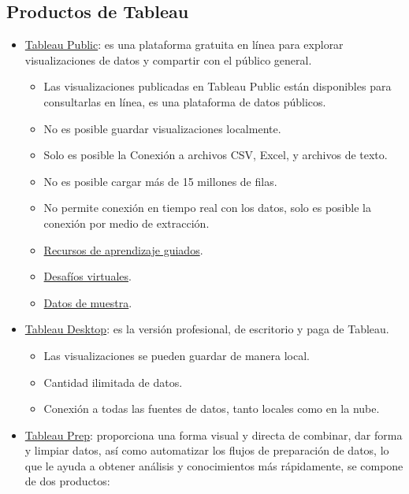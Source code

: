 \documentclass[
]{book}
\providecommand{\tightlist}{%
  \setlength{\itemsep}{0pt}\setlength{\parskip}{0pt}}
\begin{document}
\hypertarget{productos-de-tableau}{%
\subsection{Productos de Tableau}\label{productos-de-tableau}}

\begin{itemize}
\item
  \href{https://public.tableau.com/en-us/s/}{Tableau Public}: es una plataforma gratuita en línea para explorar visualizaciones de datos y compartir con el público general.

  \begin{itemize}
  \tightlist
  \item
    Las visualizaciones publicadas en Tableau Public están disponibles para consultarlas en línea, es una plataforma de datos públicos.
  \item
    No es posible guardar visualizaciones localmente.
  \item
    Solo es posible la Conexión a archivos CSV, Excel, y archivos de texto.
  \item
    No es posible cargar más de 15 millones de filas.
  \item
    No permite conexión en tiempo real con los datos, solo es posible la conexión por medio de extracción.
  \item
    \href{https://public.tableau.com/es-es/s/resources}{Recursos de aprendizaje guiados}.
  \item
    \href{https://public.tableau.com/es-es/s/resources}{Desafíos virtuales}.
  \item
    \href{https://public.tableau.com/es-es/s/resources}{Datos de muestra}.
  \end{itemize}
\item
  \href{https://www.tableau.com/products/desktop}{Tableau Desktop}: es la versión profesional, de escritorio y paga de Tableau.

  \begin{itemize}
  \tightlist
  \item
    Las visualizaciones se pueden guardar de manera local.
  \item
    Cantidad ilimitada de datos.
  \item
    Conexión a todas las fuentes de datos, tanto locales como en la nube.
  \end{itemize}
\item
  \href{https://www.tableau.com/trial/tableau-prep?utm_campaign_id=2017049\&utm_campaign=Prospecting-CORE-ALL-ALL-ALL-ALL\&utm_medium=Paid+Search\&utm_source=Google+Search\&utm_language=EN\&utm_country=RoLAC\&kw=\%2Btableau\%20\%2Bprep\&adgroup=CTX-Brand-Tableau+Prep-EN-B\&adused=335523927259\&matchtype=b\&placement=\&gclid=CjwKCAjw0On8BRAgEiwAincsHMNUqIicWtve96Be3NVOstpKxXYHS87VxJn-dxW5W3dLcqPzrbZDjRoClTkQAvD_BwE\&gclsrc=aw.ds}{Tableau Prep}: proporciona una forma visual y directa de combinar, dar forma y limpiar datos, así como automatizar los flujos de preparación de datos, lo que le ayuda a obtener análisis y conocimientos más rápidamente, se compone de dos productos:


\end{itemize}
\end{document}
